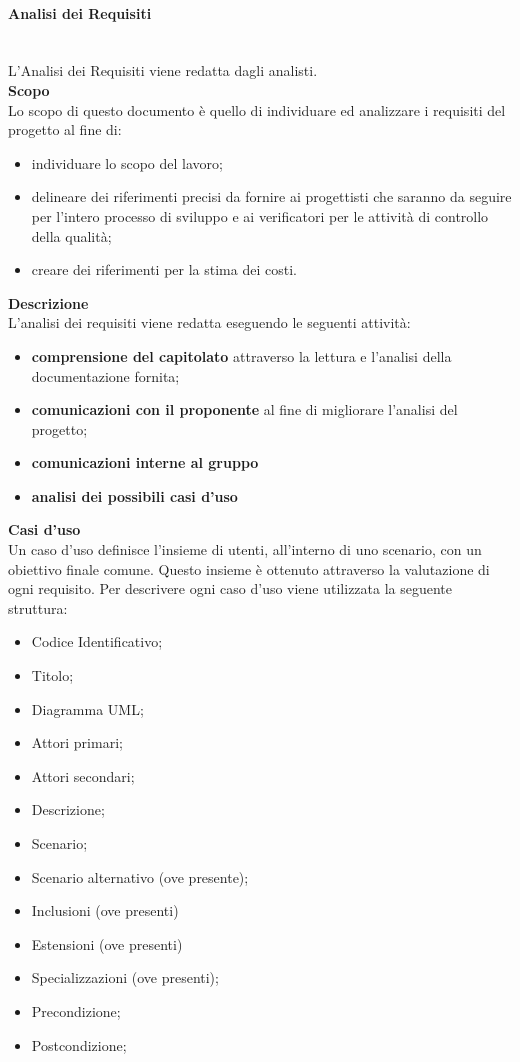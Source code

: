 \paragraph{Analisi dei Requisiti} \mbox{}
\\L'Analisi dei Requisiti viene redatta dagli analisti.
\\ \textbf{Scopo}\\ 
Lo scopo di questo documento è quello di individuare ed analizzare i requisiti del progetto al fine di:
\begin{itemize}
	\item individuare lo scopo del lavoro;
	\item delineare dei riferimenti precisi da fornire ai progettisti che saranno da seguire per l'intero processo di sviluppo e ai verificatori per le attività di controllo della qualità;
	\item creare dei riferimenti per la stima dei costi.
\end{itemize}
\textbf{Descrizione}\\
L'analisi dei requisiti viene redatta eseguendo le seguenti attività:
\begin{itemize}
	\item \textbf{comprensione del capitolato} attraverso la lettura e l'analisi della documentazione fornita;
	\item \textbf{comunicazioni con il proponente} al fine di migliorare l'analisi del progetto;
	\item \textbf{comunicazioni interne al gruppo}
	\item \textbf{analisi dei possibili casi d'uso}
\end{itemize}
\textbf{Casi d'uso}\\
Un caso d'uso definisce l'insieme di utenti, all'interno di uno scenario, con un obiettivo finale comune. Questo insieme è ottenuto attraverso la valutazione di ogni requisito.
Per descrivere ogni caso d'uso viene utilizzata la seguente struttura:
\begin{itemize}
	\item Codice Identificativo;
	\item Titolo;
	\item Diagramma UML;
	\item Attori primari;
	\item Attori secondari;
	\item Descrizione;
	\item Scenario;
	\item Scenario alternativo (ove presente);
	\item Inclusioni (ove presenti)
	\item Estensioni (ove presenti)
	\item Specializzazioni (ove presenti);
	\item Precondizione;
	\item Postcondizione;	
\end{itemize}
